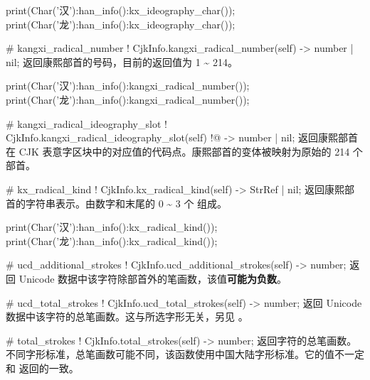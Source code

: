 \documentclass[class=article,doc={kv-usage}]{cusdoc}
\begin{document}
\begin{luarun}{}
print(Char('汉'):han_info():kx_ideography_char());
print(Char('龙'):han_info():kx_ideography_char());
\end{luarun}

\begin{luadoc*}{}
# kangxi_radical_number
! CjkInfo.kangxi_radical_number(self) -> number | nil;
返回康熙部首的号码，目前的返回值为 1 \~{} 214。
\end{luadoc*}

\begin{luarun}{}
print(Char('汉'):han_info():kangxi_radical_number());
print(Char('龙'):han_info():kangxi_radical_number());
\end{luarun}

\begin{luadoc*}{}
# kangxi_radical_ideography_slot
! CjkInfo.kangxi_radical_ideography_slot(self)
!@                                      -> number | nil;
返回康熙部首在 CJK 表意字区块中的对应值的代码点。康熙部首的变体被映射为原始的 214 个部首。
\end{luadoc*}

\begin{luadoc*}{}
# kx_radical_kind
! CjkInfo.kx_radical_kind(self) -> StrRef | nil;
返回康熙部首的字符串表示。由数字和末尾的 0 \~{} 3 个  组成。
\end{luadoc*}

\begin{luarun}{}
print(Char('汉'):han_info():kx_radical_kind());
print(Char('龙'):han_info():kx_radical_kind());
\end{luarun}

\begin{luadoc*}{}
# ucd_additional_strokes
! CjkInfo.ucd_additional_strokes(self) -> number;
返回 Unicode 数据中该字符除部首外的笔画数，该值\textbf{可能为负数}。
\end{luadoc*}

\begin{luadoc*}{}
# ucd_total_strokes
! CjkInfo.ucd_total_strokes(self) -> number;
返回 Unicode 数据中该字符的总笔画数。这与所选字形无关，另见 。
\end{luadoc*}

\begin{luadoc*}{}
# total_strokes
! CjkInfo.total_strokes(self) -> number;
返回字符的总笔画数。不同字形标准，总笔画数可能不同，该函数使用中国大陆字形标准。它的值不一定和  返回的一致。
\end{luadoc*}
\end{document}
